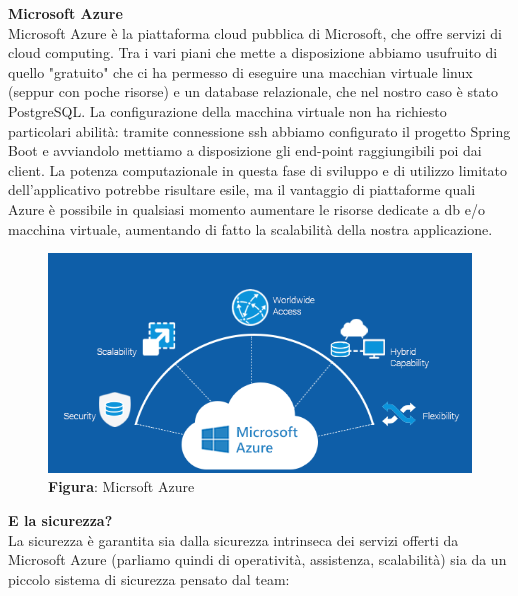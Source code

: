     \begin{flushleft}
        \textbf{Microsoft Azure}\\
        Microsoft Azure è la piattaforma cloud pubblica di Microsoft, che offre servizi di cloud computing. Tra i vari piani che mette a disposizione abbiamo usufruito
        di quello "gratuito" che ci ha permesso di eseguire una macchian virtuale linux (seppur con poche risorse) e un database relazionale, che nel nostro caso è stato PostgreSQL.
        La configurazione della macchina virtuale non ha richiesto particolari abilità: tramite connessione ssh abbiamo configurato il progetto Spring Boot e avviandolo 
        mettiamo a disposizione gli end-point raggiungibili poi dai client.
        La potenza computazionale in questa fase di sviluppo e di utilizzo limitato dell'applicativo potrebbe risultare esile, ma il vantaggio di piattaforme quali
        Azure è possibile in qualsiasi momento aumentare le risorse dedicate a db e/o macchina virtuale, aumentando di fatto la scalabilità della nostra applicazione.
    \end{flushleft}

    \begin{figure}[H]
        \centering
        \includegraphics[scale=0.5]{assets/immagini varie/azure loc.png}
        \caption*{\textbf{Figura}: Micrsoft Azure}\label{fig:mic_az}
    \end{figure}
    \newpage
    \begin{flushleft}
        \textbf{E la sicurezza?}\\
        La sicurezza è garantita sia dalla sicurezza intrinseca dei servizi offerti da Microsoft Azure (parliamo quindi di operatività, assistenza, scalabilità) sia da un piccolo sistema di sicurezza pensato dal team:
    \end{flushleft}

